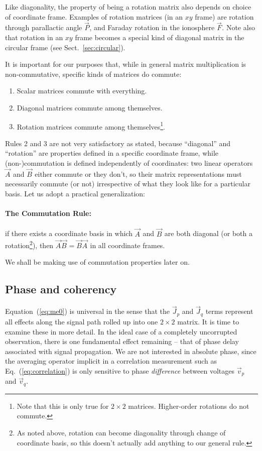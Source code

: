 \documentclass[referee]{aa}
\newcommand{\jones}[2]{\vec {#1}_{#2}}
\begin{document}
Like diagonality, the property of being a rotation matrix also depends on choice of coordinate frame. Examples of rotation matrices (in an $xy$ frame) are rotation through parallactic angle $\jones{P}{}$, and Faraday rotation in the ionosphere $\jones{F}{}$. Note also that rotation in an $xy$ frame becomes a special kind of diagonal matrix in the circular frame (see Sect.~\ref{sec:circular}).

It is important for our purposes that, while in general matrix multiplication is non-commutative, specific kinds of matrices do commute:

\begin{enumerate}
\item Scalar matrices commute with everything.
\item Diagonal matrices commute among themselves.
\item Rotation matrices commute among themselves\footnote{Note that this is only true for $2\times2$ matrices. Higher-order rotations do not commute.}.
\end{enumerate}

Rules 2 and 3 are not very satisfactory as stated, because ``diagonal'' and ``rotation'' are properties defined in a specific coordinate frame, while (non-)commutation is defined independently of coordinates: two linear operators $\jones{A}{}$ and $\jones{B}{}$ either commute or they don't, so their matrix representations must necessarily commute (or not) irrespective of what they look like for a particular basis. Let us adopt a practical generalization: 

\paragraph{The Commutation Rule:} if there exists a coordinate basis in which $\jones{A}{}$ and $\jones{B}{}$ are both diagonal (or both a rotation\footnote{As noted above, rotation can become diagonality through change of coordinate basis, so this doesn't actually add anything to our general rule.}), then $\jones{A}{} \jones{B}{}=\jones{B}{}\jones{A}{}$ in all coordinate frames. 

We shall be making use of commutation properties later on.

\subsection{\label{sec:coherency}Phase and coherency}

Equation~(\ref{eq:me0}) is universal in the sense that the $\jones{J}{p}$ and $\jones{J}{q}$ terms represent all effects along the signal path rolled up into one $2\times2$ matrix. It is time to examine these in more detail. In the ideal case of a completely uncorrupted observation, there is one fundamental effect remaining -- that of phase delay associated with signal propagation. We are not interested in absolute phase, since the averaging operator implicit in a correlation measurement such as Eq.~(\ref{eq:correlation}) is only sensitive to phase {\em difference} between voltages $\vec v_p$ and $\vec v_q$. 
\end{document}
